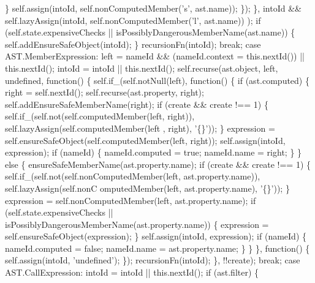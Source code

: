 \begin{DoxyCodeInclude}
{{{            \}
            self.assign(intoId, self.nonComputedMember(\textcolor{stringliteral}{'s'}, ast.name));
          \});
        \}, intoId && \textcolor{keyword}{self}.lazyAssign(intoId, \textcolor{keyword}{self}.nonComputedMember(\textcolor{charliteral}{'l'}, ast.name))
        );
      \textcolor{keywordflow}{if} (\textcolor{keyword}{self}.state.expensiveChecks || isPossiblyDangerousMemberName(ast.name)) \{
        \textcolor{keyword}{self}.addEnsureSafeObject(intoId);
      \}
      recursionFn(intoId);
      \textcolor{keywordflow}{break};
    \textcolor{keywordflow}{case} AST.MemberExpression:
      left = nameId && (nameId.context = this.nextId()) || this.nextId();
      intoId = intoId || this.nextId();
      \textcolor{keyword}{self}.recurse(ast.object, left, undefined, \textcolor{keyword}{function}() \{
        self.if\_(self.notNull(left), function() \{
          if (ast.computed) \{
            right = self.nextId();
            self.recurse(ast.property, right);
            self.addEnsureSafeMemberName(right);
            if (create && create !== 1) \{
              self.if\_(self.not(self.computedMember(left, right)), self.lazyAssign(self.computedMember(left
      , right), \textcolor{stringliteral}{'\{\}'}));
            \}
            expression = self.ensureSafeObject(self.computedMember(left, right));
            self.assign(intoId, expression);
            if (nameId) \{
              nameId.computed = true;
              nameId.name = right;
            \}
          \} else \{
            ensureSafeMemberName(ast.property.name);
            if (create && create !== 1) \{
              self.if\_(self.not(self.nonComputedMember(left, ast.property.name)), self.lazyAssign(self.nonC
      omputedMember(left, ast.property.name), \textcolor{stringliteral}{'\{\}'}));
            \}
            expression = self.nonComputedMember(left, ast.property.name);
            if (self.state.expensiveChecks || isPossiblyDangerousMemberName(ast.property.name)) \{
              expression = self.ensureSafeObject(expression);
            \}
            self.assign(intoId, expression);
            if (nameId) \{
              nameId.computed = false;
              nameId.name = ast.property.name;
            \}
          \}
        \}, \textcolor{keyword}{function}() \{
          self.assign(intoId, \textcolor{stringliteral}{'undefined'});
        \});
        recursionFn(intoId);
      \}, !!create);
      \textcolor{keywordflow}{break};
    \textcolor{keywordflow}{case} AST.CallExpression:
      intoId = intoId || this.nextId();
      \textcolor{keywordflow}{if} (ast.filter) \{
}}}
\end{DoxyCodeInclude}
